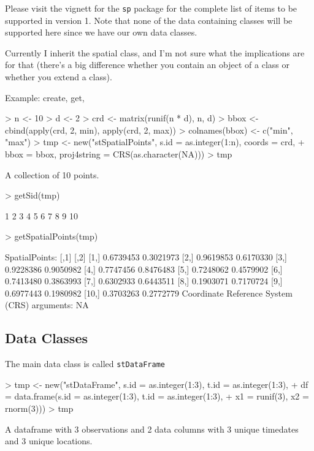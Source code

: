 \documentclass{article}
\begin{document}
Please visit the vignett for the \texttt{sp} package for the
complete list of items to be supported in version 1.  Note that none
of the data containing classes will be supported here since we have
our own data classes.

Currently I inherit the spatial class, and I'm not sure what the
implications are for that (there's a big difference whether you
contain an object of a class or whether you extend a class).

Example: create, get,
\begin{Schunk}
\begin{Sinput}
> n <- 10
> d <- 2
> crd <- matrix(runif(n * d), n, d)
> bbox <- cbind(apply(crd, 2, min), apply(crd, 2, max))
> colnames(bbox) <- c("min", "max")
> tmp <- new("stSpatialPoints", s.id = as.integer(1:n), coords = crd, 
+     bbox = bbox, proj4string = CRS(as.character(NA)))
> tmp
\end{Sinput}
\begin{Soutput}
A collection of 10 points.
\end{Soutput}
\begin{Sinput}
> getSid(tmp)
\end{Sinput}
\begin{Soutput}
 [1]  1  2  3  4  5  6  7  8  9 10
\end{Soutput}
\begin{Sinput}
> getSpatialPoints(tmp)
\end{Sinput}
\begin{Soutput}
SpatialPoints:
           [,1]      [,2]
 [1,] 0.6739453 0.3021973
 [2,] 0.9619853 0.6170330
 [3,] 0.9228386 0.9050982
 [4,] 0.7747456 0.8476483
 [5,] 0.7248062 0.4579902
 [6,] 0.7413480 0.3863993
 [7,] 0.6302933 0.6443511
 [8,] 0.1903071 0.7170724
 [9,] 0.6977443 0.1980982
[10,] 0.3703263 0.2772779
Coordinate Reference System (CRS) arguments: NA 
\end{Soutput}
\end{Schunk}


\subsection*{Data Classes}
The main data class is called \texttt{stDataFrame}
\begin{Schunk}
\begin{Sinput}
> tmp <- new("stDataFrame", s.id = as.integer(1:3), t.id = as.integer(1:3), 
+     df = data.frame(s.id = as.integer(1:3), t.id = as.integer(1:3), 
+         x1 = runif(3), x2 = rnorm(3)))
> tmp
\end{Sinput}
\begin{Soutput}
A dataframe with 3 observations and 2 data columns with
 3 unique timedates and
 3 unique locations.
\end{Soutput}
\end{Schunk}
\end{document}
